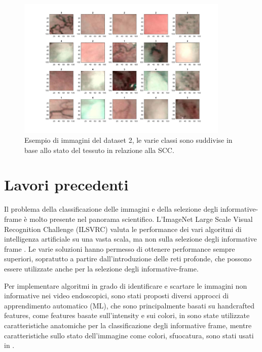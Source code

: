 \begin{figure}[ht]
    \centering
    \includegraphics[width=0.9\textwidth]{introduzione/dataset-2-ml.JPG}
    \caption[Esempio di immagini del dataset 2]{Esempio di immagini del dataset 2, le varie classi sono suddivise in base allo stato del tessuto in relazione alla SCC.}
    \label{fig:dataset2ml}
\end{figure}

\section{Lavori precedenti}\label{lavori-precedenti}

Il problema  della classificazione delle immagini e della selezione degli informative-frame è molto presente nel panorama scientifico. L'ImageNet Large Scale Visual Recognition Challenge (ILSVRC) valuta le performance dei vari algoritmi di intelligenza artificiale su una vasta scala, ma non sulla selezione degli informative frame \cite{imagenet}. Le varie soluzioni hanno permesso di ottenere performance sempre superiori, sopratutto a partire dall'introduzione delle reti profonde, che possono essere utilizzate anche per la selezione degli informative-frame.

Per implementare algoritmi in grado di identificare e scartare le immagini non informative nei video endoscopici, sono stati proposti diversi approcci di apprendimento automatico (ML), che sono principalmente basati su handcrafted features, come features basate sull'intensity e sui colori, in \citeauthor{zhang_colon} \cite{zhang_colon} sono state utilizzate caratteristiche anatomiche per la classificazione degli informative frame, mentre caratteristiche sullo stato dell'immagine come colori, sfuocatura, sono stati usati in \citeauthor{armin_colonscopy} \cite{armin_colonscopy}. 

